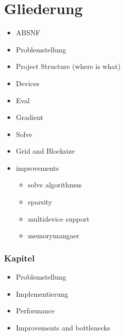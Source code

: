 \section{Gliederung}
\begin{itemize}
	\item ABSNF
	\item Problemstellung
	\item Project Structure (where is what)
	\item Devices
	\item Eval
	\item Gradient
	\item Solve
	\item Grid and Blocksize
	\item improvements
	\begin{itemize}
		\item solve algorithmus
		\item sparsity
		\item multidevice support
		\item memorymangaer
	\end{itemize}
\end{itemize}

\subsubsection{Kapitel}
\begin{itemize}
	\item Problemstellung
	\item Implementierung
	\item Performance
	\item Improvements and bottlenecks
\end{itemize}
